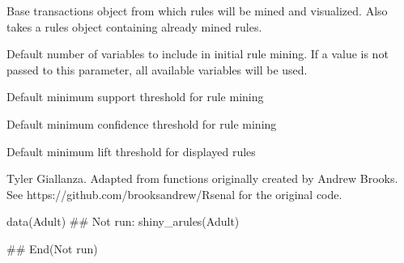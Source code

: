 \documentclass[letterpaper]{book}
\begin{document}
%
\begin{Arguments}
\begin{ldescription}
\item[\code{dataset}] Base transactions object from which rules will be mined and visualized. Also takes a rules object containing already mined rules.
\item[\code{vars}] Default number of variables to include in initial rule mining. If a value is not passed to this parameter, all available variables will be used.
\item[\code{supp}] Default minimum support threshold for rule mining
\item[\code{conf}] Default minimum confidence threshold for rule mining
\item[\code{lift}] Default minimum lift threshold for displayed rules
\end{ldescription}
\end{Arguments}
%
\begin{Author}\relax
Tyler Giallanza. Adapted from functions originally created by Andrew Brooks.
See https://github.com/brooksandrew/Rsenal for the original code.
\end{Author}
%
\begin{Examples}
\begin{ExampleCode}
data(Adult)
## Not run: 
  shiny_arules(Adult)

## End(Not run)
\end{ExampleCode}
\end{Examples}
\printindex{}
\end{document}
